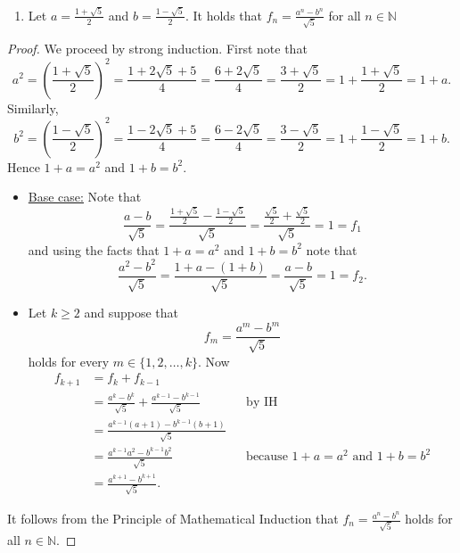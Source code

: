 \documentclass[11pt]{article}
\def\naturals{\mathbb{N}}
\begin{document}
\begin{enumerate}
\begin{enumerate}
 \item Let $a = \frac{1+\sqrt{5}}{2}$ and $b = \frac{1-\sqrt{5}}{2}$. It holds that $f_n = \frac{a^n - b^n}{\sqrt{5}}$ for all $n\in\naturals$
\end{enumerate}

   \begin{Solution}
  \begin{proof}
   We proceed by strong induction. First note that 
   \[
    a^2 = \left(\frac{1+\sqrt{5}}{2}\right)^2 = \frac{1+2\sqrt{5}+5}{4} = \frac{6+2\sqrt{5}}{4} = \frac{3+\sqrt{5}}{2} = 1 + \frac{1+\sqrt{5}}{2} = 1+a.
   \]
Similarly, 
\[
    b^2 = \left(\frac{1-\sqrt{5}}{2}\right)^2 = \frac{1-2\sqrt{5}+5}{4} = \frac{6-2\sqrt{5}}{4} = \frac{3-\sqrt{5}}{2} = 1 + \frac{1-\sqrt{5}}{2} = 1+b.
   \]
Hence $1+a=a^2$ and $1+b=b^2$. 
  \begin{itemize}
   \item \underline{Base case:} Note that 
   \[
    \frac{a-b}{\sqrt{5}} = \frac{\frac{1+\sqrt{5}}{2} - \frac{1-\sqrt{5}}{2}}{\sqrt{5}} = \frac{\frac{\sqrt{5}}{2} + \frac{\sqrt{5}}{2}}{\sqrt{5}} = 1 = f_1
   \]
   and using the facts that $1+a=a^2$ and $1+b=b^2$ note that 
   \[
    \frac{a^2-b^2}{\sqrt{5}} = \frac{1+a - (1+b)}{\sqrt{5}} = \frac{a-b}{\sqrt{5}} = 1 = f_2.
   \]

\item \underline{} Let $k\geq2$ and suppose that 
\[
 f_m = \frac{a^m-b^m}{\sqrt{5}} \tag{IH}
\]
holds for every $m\in\{1,2,\dots,k\}$. Now
 \begin{align*}
  f_{k+1} &= f_k + f_{k-1} \\ 
  & = \frac{a^k-b^k}{\sqrt{5}} + \frac{a^{k-1}-b^{k-1}}{\sqrt{5}} && \text{by IH}\\
  & = \frac{a^{k-1}(a+1) - b^{k-1}(b+1)}{\sqrt{5}} \\
  & = \frac{a^{k-1}a^2 - b^{k-1}b^2}{\sqrt{5}} && \text{because }1+a=a^2\text{ and }1+b=b^2\\
  & = \frac{a^{k+1} - b^{k+1}}{\sqrt{5}}.
 \end{align*}
\end{itemize}
It follows from the Principle of Mathematical Induction that $f_n = \frac{a^n - b^n}{\sqrt{5}}$ holds for all $n\in\naturals$.
 \end{proof}
\end{Solution}
\end{enumerate}
\end{document}
